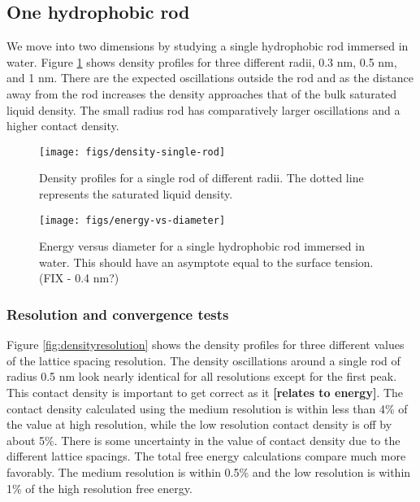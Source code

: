 \documentclass[letterpaper,twocolumn,amsmath,amssymb,prb]{revtex4-1}
\newcommand{\red}[1]{{\bf \color{red} #1}}
\newcommand{\fixme}[1]{\red{[#1]}}
\begin{document}
\subsection{One hydrophobic rod}

We move into two dimensions by studying a single hydrophobic rod
immersed in water. Figure \ref{fig:density-single-rod} shows density
profiles for three different radii, 0.3 nm, 0.5 nm, and 1 nm. There are the
expected oscillations outside the rod and as the distance away from the rod increases
the density approaches that of the bulk saturated liquid density. The small radius
rod has comparatively larger oscillations and a higher contact density.

\begin{figure}
\begin{center}
\texttt{[image: figs/density-single-rod]}
\end{center}
\caption{ Density profiles for a single rod of different radii. The dotted line
represents the saturated liquid density.  }
\label{fig:density-single-rod}
\end{figure}

\begin{figure}
\begin{center}
\texttt{[image: figs/energy-vs-diameter]}
\end{center}
\caption{ Energy versus diameter for a single hydrophobic rod
immersed in water. This should have an asymptote equal to the surface
tension. (FIX - 0.4 nm?) }
\label{fig:energy-vs-diameter}
\end{figure}

\subsubsection{Resolution and convergence tests}

Figure \ref{fig:densityresolution} shows the density profiles for three different
values of the lattice spacing resolution. The density oscillations around a single
rod of radius 0.5 nm look nearly identical for all resolutions except for the first peak. 
This contact density is important to get correct as it \fixme{relates to energy}. The 
contact density calculated using the medium resolution is within less than 4\% of the value at
high resolution, while the low resolution contact density is off by about 5\%. There is some
uncertainty in the value of contact density due to the different lattice spacings. The total
free energy calculations compare much more favorably. The medium resolution is within 
0.5\% and the low resolution is within 1\% of the high resolution free energy.
\end{document}
